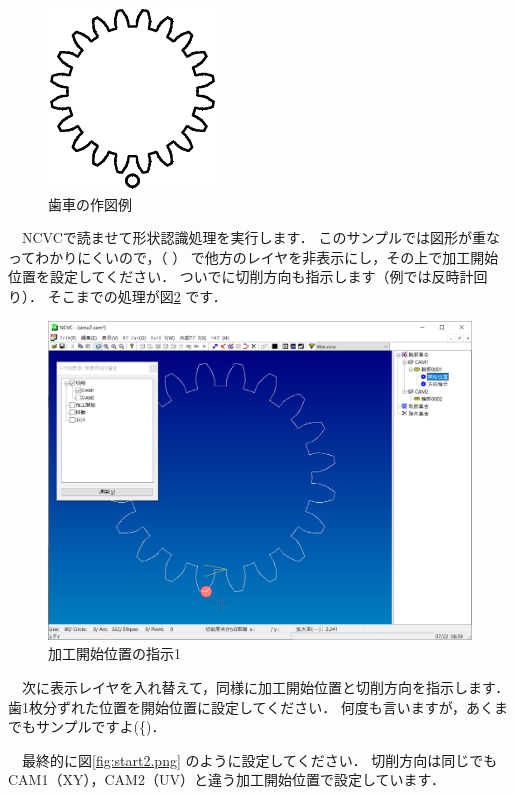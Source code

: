\begin{figure}[H]
\centering
\includegraphics{No2/fig/sample8-crop.pdf}
\caption{歯車の作図例}
\label{fig:sample8.pdf}
\end{figure}

　NCVCで読ませて形状認識処理を実行します．
このサンプルでは図形が重なってわかりにくいので，（\,\,） で他方のレイヤを非表示にし，その上で加工開始位置を設定してください．
ついでに切削方向も指示します（例では反時計回り）．
そこまでの処理が図\ref{fig:start1.png} です．

\begin{figure}[H]
\centering
\includegraphics[scale=0.5]{No2/fig/start1.png}
\caption{加工開始位置の指示1}
\label{fig:start1.png}
\end{figure}

　次に表示レイヤを入れ替えて，同様に加工開始位置と切削方向を指示します．
歯1枚分ずれた位置を開始位置に設定してください．
何度も言いますが，あくまでもサンプルですよ(^^;)．

　最終的に図\ref{fig:start2.png} のように設定してください．
切削方向は同じでもCAM1（XY），CAM2（UV）と違う加工開始位置で設定しています．


